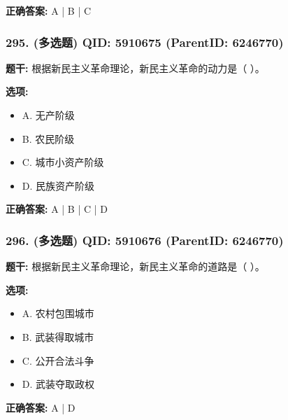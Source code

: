 \documentclass[12pt,UTF8]{ctexart}
\begin{document}
\textbf{正确答案:}
A | B | C

\vspace{0.3em}\hrulefill\vspace{0.7em}

\subsubsection*{295. (多选题) \small QID: 5910675 (ParentID: 6246770)}

\textbf{题干:}
根据新民主义革命理论，新民主义革命的动力是（ ）。



\textbf{选项:}
\begin{itemize}[leftmargin=*]

  \item A. 无产阶级

  \item B. 农民阶级

  \item C. 城市小资产阶级

  \item D. 民族资产阶级

\end{itemize}

\textbf{正确答案:}
A | B | C | D

\vspace{0.3em}\hrulefill\vspace{0.7em}

\subsubsection*{296. (多选题) \small QID: 5910676 (ParentID: 6246770)}

\textbf{题干:}
根据新民主义革命理论，新民主义革命的道路是（ ）。



\textbf{选项:}
\begin{itemize}[leftmargin=*]

  \item A. 农村包围城市

  \item B. 武装得取城市

  \item C. 公开合法斗争

  \item D. 武装夺取政权

\end{itemize}

\textbf{正确答案:}
A | D
\end{document}
